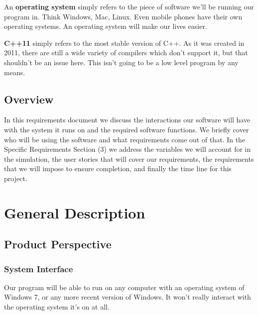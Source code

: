 \documentclass[onecolumn, draftclsnofoot,10pt, compsoc]{IEEEtran}
\begin{document}
\begin{singlespace}
    \vspace{.1cm}
    \noindent An \textbf{operating system} simply refers to the piece of software we'll be running our program in.
    Think Windows, Mac, Linux.
    Even mobile phones have their own operating systems.
    An operating system will make our lives easier.
    
    \vspace{.1cm}
    \noindent \textbf{C++11} simply refers to the most stable version of C++.
    As it was created in 2011, there are still a wide variety of compilers which don't support it, but that shouldn't be an issue here.
    This isn't going to be a low level program by any means.
    
    \subsection{Overview}
    In this requirements document we discuss the interactions our software will have with the system it runs on and the required software functions. We briefly cover who will be using the software and what requirements come out of that. In the Specific Requirements Section (3) we address the variables we will account for in the simulation, the user stories that will cover our requirements, the requirements that we will impose to ensure completion, and finally the time line for this project.

\section{General Description}
    
    \subsection{Product Perspective}
    
        \subsubsection{System Interface}    %
        Our program will be able to run on any computer with an operating system of Windows 7, or any more recent version of Windows.
        It won't really interact with the operating system it's on at all.
        

\end{singlespace}
\end{document}
